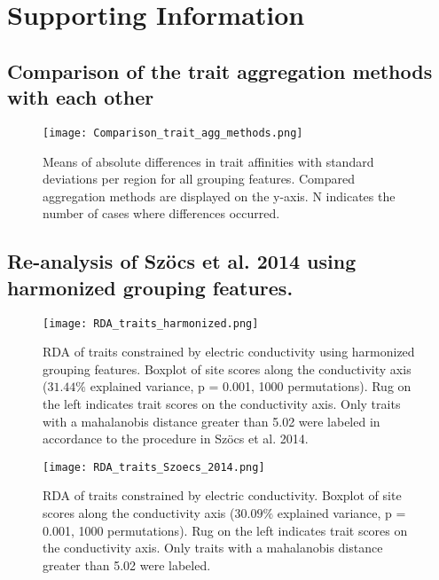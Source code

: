 \documentclass[../Draft_harmonization_paper.tex]{subfiles}
\begin{document}
\section*{Supporting Information}
\label{sec:SI}

\subsection*{Comparison of the trait aggregation methods with each other}

\begin{figure}[H]
    \centering
    \texttt{[image: Comparison\_trait\_agg\_methods.png]}
    \caption{Means of absolute differences in trait affinities with standard deviations per region for all grouping features. Compared aggregation methods are displayed on the y-axis. N indicates the number of cases where differences occurred.}
\end{figure}


\newpage

\subsection*{Re-analysis of Szöcs et al. 2014 using harmonized grouping features.}
\label{subsec:SI_szoecs_reanalysis}

\begin{figure}[H]
    \centering
    \texttt{[image: RDA\_traits\_harmonized.png]}
    \caption{RDA of traits constrained by electric conductivity using harmonized grouping features. Boxplot of site scores along the conductivity axis ($31.44 \%$ explained variance, p = 0.001, 1000 permutations). Rug on the left indicates trait scores on the conductivity axis. Only traits with a mahalanobis distance greater than 5.02 were labeled in accordance to the procedure in Szöcs et al. 2014.
    } 
\end{figure}

\begin{figure}[H]
    \centering
    \texttt{[image: RDA\_traits\_Szoecs\_2014.png]}
    \caption{RDA of traits constrained by electric conductivity. Boxplot of site scores along the conductivity axis ($30.09 \%$ explained variance, p = 0.001, 1000 permutations). Rug on the left indicates trait scores on the conductivity axis. Only traits with a mahalanobis distance greater than 5.02 were labeled.
    } 
\end{figure}
\end{document}
